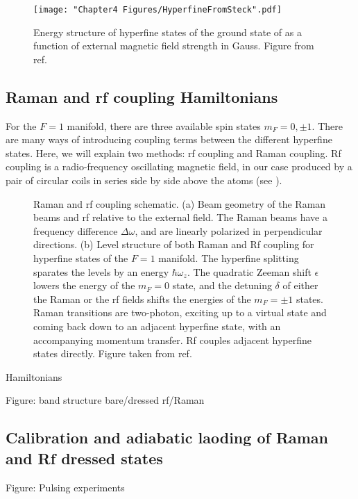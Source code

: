 \begin{figure}
	\texttt{[image: "Chapter4 Figures/HyperfineFromSteck".pdf]}
\caption{Energy structure of hyperfine states of the ground state of \Rb{} as a function of external magnetic field strength in Gauss.  Figure from ref. \cite{Steck}}
\label{fig:hyperfineSteck}
\end{figure}

\subsection{Raman and rf coupling Hamiltonians}

	For the $F=1$ manifold, there are three available spin states $m_F = 0,\pm1$. There are many ways of introducing coupling terms between the different hyperfine states. Here, we will explain two methods: rf coupling and Raman coupling. Rf coupling is a radio-frequency oscillating magnetic field, in our case produced by a pair of circular coils in series side by side above the atoms (see \cite{KarinaThesis}).

\begin{figure}
\caption{Raman and rf coupling schematic. (a) Beam geometry of the Raman beams and rf relative to the external field. The Raman beams have a frequency difference $\Delta\omega$, and are linearly polarized in perpendicular directions. (b) Level structure of both Raman and Rf coupling for hyperfine states of the $F=1$ manifold. The hyperfine splitting sparates  the levels by an energy $\hbar\omega_z$. The quadratic Zeeman shift $\epsilon$ lowers the energy of the $m_F=0$ state, and the detuning $\delta$ of either the Raman or the rf fields shifts the energies of the $m_F=\pm1$ states. Raman transitions are two-photon, exciting up to a virtual state and coming back down to an adjacent hyperfine state, with an accompanying momentum transfer. Rf couples adjacent hyperfine states directly. Figure taken from ref. \cite{Karina2012}}
\label{fig:RamanRfSchematic}
\end{figure}

Hamiltonians 

Figure: band structure bare/dressed rf/Raman


\subsection{Calibration and adiabatic laoding of Raman and Rf dressed states}
Figure: Pulsing experiments

